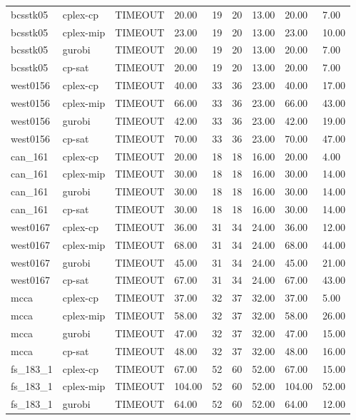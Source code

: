 \begin{tabular}{lllllllll}
bcsstk05 & cplex-cp & TIMEOUT & 20.00 & 19 & 20 & 13.00 & 20.00 & 7.00 \\
bcsstk05 & cplex-mip & TIMEOUT & 23.00 & 19 & 20 & 13.00 & 23.00 & 10.00 \\
bcsstk05 & gurobi & TIMEOUT & 20.00 & 19 & 20 & 13.00 & 20.00 & 7.00 \\
bcsstk05 & cp-sat & TIMEOUT & 20.00 & 19 & 20 & 13.00 & 20.00 & 7.00 \\
west0156 & cplex-cp & TIMEOUT & 40.00 & 33 & 36 & 23.00 & 40.00 & 17.00 \\
west0156 & cplex-mip & TIMEOUT & 66.00 & 33 & 36 & 23.00 & 66.00 & 43.00 \\
west0156 & gurobi & TIMEOUT & 42.00 & 33 & 36 & 23.00 & 42.00 & 19.00 \\
west0156 & cp-sat & TIMEOUT & 70.00 & 33 & 36 & 23.00 & 70.00 & 47.00 \\
can\_161 & cplex-cp & TIMEOUT & 20.00 & 18 & 18 & 16.00 & 20.00 & 4.00 \\
can\_161 & cplex-mip & TIMEOUT & 30.00 & 18 & 18 & 16.00 & 30.00 & 14.00 \\
can\_161 & gurobi & TIMEOUT & 30.00 & 18 & 18 & 16.00 & 30.00 & 14.00 \\
can\_161 & cp-sat & TIMEOUT & 30.00 & 18 & 18 & 16.00 & 30.00 & 14.00 \\
west0167 & cplex-cp & TIMEOUT & 36.00 & 31 & 34 & 24.00 & 36.00 & 12.00 \\
west0167 & cplex-mip & TIMEOUT & 68.00 & 31 & 34 & 24.00 & 68.00 & 44.00 \\
west0167 & gurobi & TIMEOUT & 45.00 & 31 & 34 & 24.00 & 45.00 & 21.00 \\
west0167 & cp-sat & TIMEOUT & 67.00 & 31 & 34 & 24.00 & 67.00 & 43.00 \\
mcca & cplex-cp & TIMEOUT & 37.00 & 32 & 37 & 32.00 & 37.00 & 5.00 \\
mcca & cplex-mip & TIMEOUT & 58.00 & 32 & 37 & 32.00 & 58.00 & 26.00 \\
mcca & gurobi & TIMEOUT & 47.00 & 32 & 37 & 32.00 & 47.00 & 15.00 \\
mcca & cp-sat & TIMEOUT & 48.00 & 32 & 37 & 32.00 & 48.00 & 16.00 \\
fs\_183\_1 & cplex-cp & TIMEOUT & 67.00 & 52 & 60 & 52.00 & 67.00 & 15.00 \\
fs\_183\_1 & cplex-mip & TIMEOUT & 104.00 & 52 & 60 & 52.00 & 104.00 & 52.00 \\
fs\_183\_1 & gurobi & TIMEOUT & 64.00 & 52 & 60 & 52.00 & 64.00 & 12.00 \\

\end{tabular}

